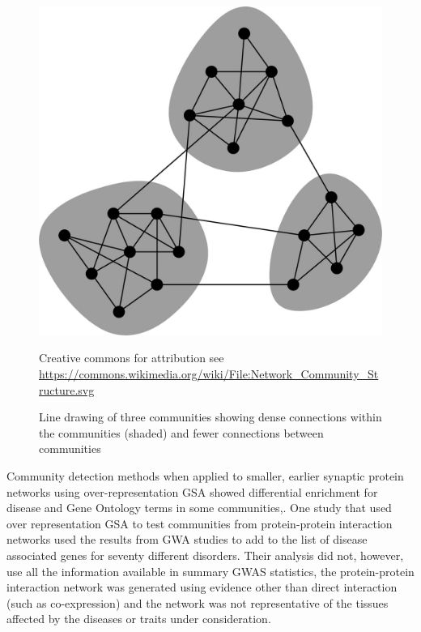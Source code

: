 \begin{figure}
    \centering
    \includegraphics[width=\textwidth]{images/chapter_community_detection/creative_commons/F1large.jpg}
    \caption[Figure of three communities]{Line drawing of three communities showing dense connections within the communities (shaded) and fewer connections between communities}
    \tiny Creative commons for attribution see \url{https://commons.wikimedia.org/wiki/File:Network_Community_Structure.svg}
    \label{fig:communities}
\end{figure}

 Community detection methods when applied to smaller, earlier synaptic protein networks using over-representation GSA showed differential enrichment for disease and Gene Ontology terms in some communities\cite{pocklington2006proteomes},\cite{mclean2016improved}.  One study that used over representation GSA to test communities from protein-protein interaction networks used the results from GWA studies to add to the list of disease associated genes for seventy different disorders\cite{ghiassian2015disease}. Their analysis did not, however, use all the information available in summary GWAS statistics, the protein-protein interaction network was generated using evidence other than direct interaction (such as co-expression) and the network was not representative of the tissues affected by the diseases or traits under consideration\cite{ghiassian2015disease}.

